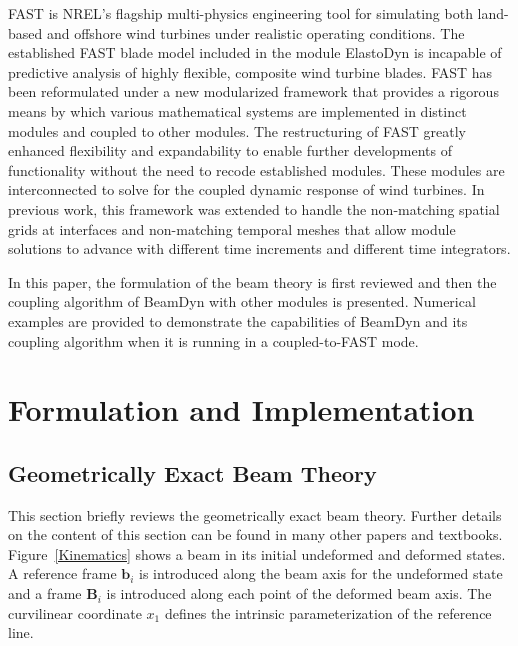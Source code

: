 \documentclass{aiaa-tc}
\begin{document}
FAST is NREL's flagship multi-physics engineering tool for simulating both land-based and offshore wind turbines under realistic operating conditions.  
The established FAST blade model included in the module ElastoDyn is incapable 
of predictive analysis of highly flexible, composite wind turbine blades. 
FAST has been reformulated under a new modularized framework that provides a rigorous means by which various mathematical systems are implemented in distinct modules and coupled to other modules. 
The restructuring of FAST greatly enhanced flexibility and expandability to enable further developments of functionality without the need to recode established modules. 
These modules are interconnected to solve for the coupled dynamic response of wind turbines. \cite{Jonkman:2013,website:FASTModularizationFramework} In previous work, this framework was extended to handle the non-matching spatial grids at interfaces and non-matching temporal meshes that allow module solutions to advance with different time increments and different time integrators.\cite{Sprague:FAST2015}

In this paper, the formulation of the beam theory is first reviewed and then the coupling algorithm of BeamDyn with other modules is presented. 
Numerical examples are provided to demonstrate the capabilities of BeamDyn and its coupling algorithm when it is running in a coupled-to-FAST mode.

\section{Formulation and Implementation}

\subsection{Geometrically Exact Beam Theory}

This section briefly reviews the geometrically exact beam theory. Further details on the content of this section can be found in many other papers\cite{YuGEBT} and textbooks. \cite{HodgesBeamBook,Bauchau:2010}
Figure~\ref{Kinematics} shows a beam in its initial undeformed
and deformed states. A reference frame $\mathbf{b}_i$ is introduced along the
beam axis for the undeformed state and a frame $\mathbf{B}_i$ is introduced
along each point of the deformed beam axis. The curvilinear coordinate $x_1$ defines the intrinsic parameterization of the reference line.
\end{document}
